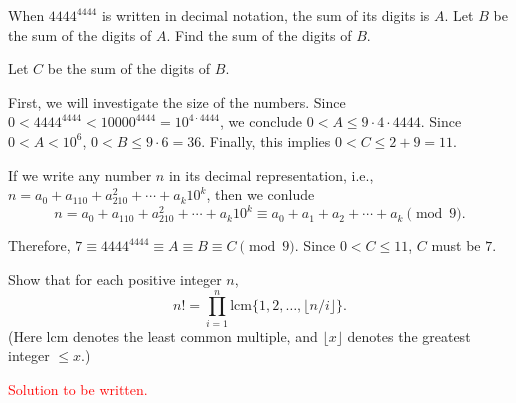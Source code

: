 
\begin{prob}
	When \(4444^{4444}\) is written in decimal notation, the sum of its digits is \(A\).  Let \(B\) be the sum of the digits of \(A\). Find the sum of the digits of \(B\).
\end{prob}

\begin{sol}
	Let \(C\) be the sum of the digits of \(B\).

	First, we will investigate the size of the numbers.
	Since \(0 < 4444^{4444} < 10000^{4444} = 10^{4\cdot4444}\), we conclude \(0 < A \leq 9 \cdot 4 \cdot 4444\). Since \(0 < A < 10^6\), \(0 < B \leq 9 \cdot 6 = 36\). Finally, this implies \(0 < C \leq 2 + 9 = 11\).

	If we write any number \(n\) in its decimal representation, i.e., \(n = a_0 + a_110 + a_210^2 + \cdots + a_k10^k\), then we conlude \[
		n = a_0 + a_110 + a_210^2 + \cdots + a_k10^k \equiv a_0 + a_1 + a_2 + \cdots + a_k \pmod{9}.
	\]

	Therefore, \(7 \equiv 4444^{4444} \equiv A \equiv B \equiv C \pmod{9}\). Since \(0 < C \leq 11\), \(C\) must be \(7\).
\end{sol}

\begin{prob}%
	Show that for each positive integer $n$, \[
		n! = \prod_{i=1}^n  \mathrm{lcm}\{1, 2, \dots, \lfloor n/i\rfloor\} .
	\] (Here $\mathrm{lcm}$ denotes the least common multiple, and
	$\lfloor x \rfloor$ denotes the greatest integer $\leq x$.)
\end{prob}

\begin{sol}
	\textcolor{red}{Solution to be written.}
\end{sol}
